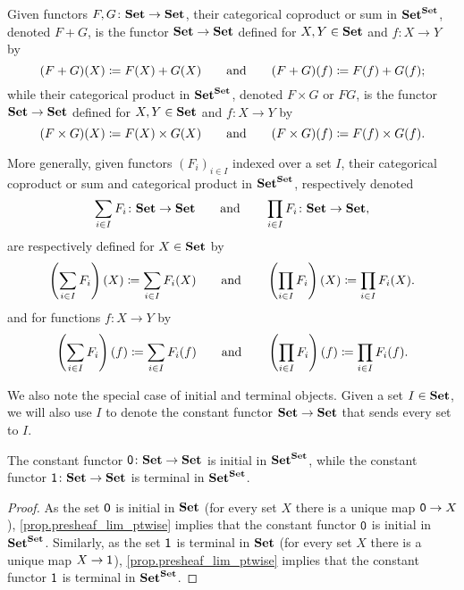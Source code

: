 \documentclass[Book-Poly]{subfiles}
\begin{document}
\begin{corollary} \label{cor.sum_prod_set_endofuncs}
    Given functors $F,G\colon\mathbf{Set}\to\mathbf{Set}$, their categorical coproduct or sum in $\mathbf{Set}^{\mathbf{Set}}$, denoted $F+G$, is the functor $\mathbf{Set}\to\mathbf{Set}$ defined for $X,Y\in\mathbf{Set}$ and $f\colon X\to Y$ by
    \[
    (F+G)(X)\coloneqq F(X)+G(X) \qquad\text{and}\qquad (F+G)(f)\coloneqq F(f)+G(f);
    \]
    while their categorical product in $\mathbf{Set}^{\mathbf{Set}}$, denoted $F\times G$ or $FG$, is the functor $\mathbf{Set}\to\mathbf{Set}$ defined for $X,Y\in\mathbf{Set}$ and $f\colon X\to Y$ by
    \[
    (F\times G)(X)\coloneqq F(X)\times G(X) \qquad\text{and}\qquad (F\times G)(f)\coloneqq F(f)\times G(f).
    \]

    More generally, given functors $(F_i)_{i\in I}$ indexed over a set $I$, their categorical coproduct or sum and categorical product in $\mathbf{Set}^{\mathbf{Set}}$, respectively denoted
    \[
    \sum_{i\in I}F_i\colon\mathbf{Set}\to\mathbf{Set}
    \qquad\text{and}\qquad
    \prod_{i\in I}F_i\colon\mathbf{Set}\to\mathbf{Set},
    \]
    are respectively defined for $X\in\mathbf{Set}$ by
    \[
    \left(\sum_{i\in I}F_i\right)(X)\coloneqq\sum_{i\in I} F_i(X)
    \qquad\text{and}\qquad
    \left(\prod_{i\in I}F_i\right)(X)\coloneqq\prod_{i\in I} F_i(X).
    \]
    and for functions $f\colon X\to Y$ by
    \[
    \left(\sum_{i\in I}F_i\right)(f)\coloneqq\sum_{i\in I} F_i(f)
    \qquad\text{and}\qquad
    \left(\prod_{i\in I}F_i\right)(f)\coloneqq\prod_{i\in I} F_i(f).
    \]
\end{corollary}


We also note the special case of initial and terminal objects.
Given a set $I\in\mathbf{Set}$, we will also use $I$ to denote the constant functor $\mathbf{Set}\to\mathbf{Set}$ that sends every set to $I$.


\begin{corollary}
    The constant functor $\textsf{0}\colon\mathbf{Set}\to\mathbf{Set}$ is initial in $\mathbf{Set}^{\mathbf{Set}}$, while the constant functor $\textsf{1}\colon\mathbf{Set}\to\mathbf{Set}$ is terminal in $\mathbf{Set}^{\mathbf{Set}}$.
\end{corollary}
\begin{proof}
    As the set $\textsf{0}$ is initial in $\mathbf{Set}$ (for every set $X$ there is a unique map $\textsf{0}\to X$), \cref{prop.presheaf_lim_ptwise} implies that the constant functor $\textsf{0}$ is initial in $\mathbf{Set}^{\mathbf{Set}}$.
    Similarly, as the set $\textsf{1}$ is terminal in $\mathbf{Set}$ (for every set $X$ there is a unique map $X\to\textsf{1}$), \cref{prop.presheaf_lim_ptwise} implies that the constant functor $\textsf{1}$ is terminal in $\mathbf{Set}^{\mathbf{Set}}$.
\end{proof}
\end{document}
